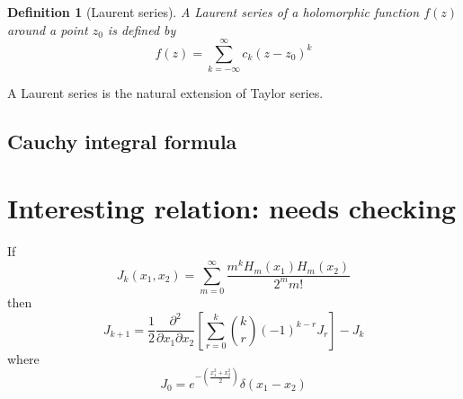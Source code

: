 \documentclass[jcp,groupaddress]{revtex4-1}
\newtheorem{definition}{Definition}
\newcommand{\eq}{\begin{equation}}
\newcommand{\qe}{\end{equation}}
\newcommand{\lp}{\left(}
\newcommand{\rp}{\right)}
\begin{document}
\begin{appendices}
\begin{definition}[Laurent series]
 A Laurent series of a holomorphic function $f(z)$ around a point $z_{0}$ is defined by
\eq
f(z) = \sum_{k=-\infty}^{\infty} c_{k} (z-z_{0})^{k}
\qe
\end{definition}
 A Laurent series is the natural extension of Taylor series.  



\subsection{Cauchy integral formula}




\section{Interesting relation: needs checking}

If
\eq
J_{k}(x_1, x_2)= \sum_{m=0}^{\infty}\frac{m^k H_{m}(x_1)H_{m}(x_2)}{2^m m!}
\qe
then
\eq
J_{k+1}= \frac{1}{2}\frac{\partial^2}{\partial x_1 \partial x_2}\left[\sum_{r=0}^{k}\binom{k}{r}(-1)^{k-r} J_{r}\right] - J_{k}
\qe
 where 
\eq
J_{0} = e^{-\lp\frac{x_1^2 + x_2^2}{2}\rp} \delta(x_1-x_2)
\qe
\end{appendices} 
\end{document}
